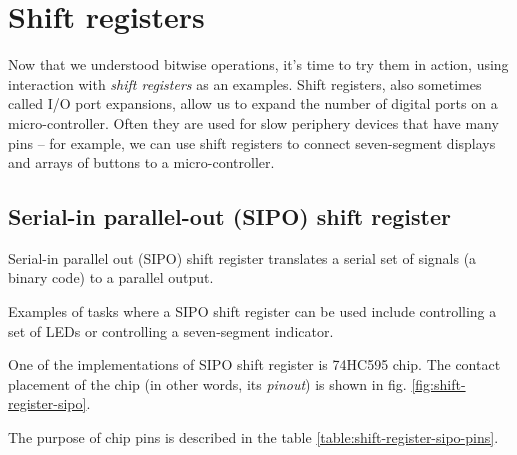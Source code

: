\documentclass[../sparc.tex]{subfiles}
\begin{document}
\newpage

\section{Shift registers}
\label{section:shift-registers}


Now that we understood bitwise operations, it's time to try them in action,
using interaction with \emph{shift registers} as an examples.  Shift registers,
also sometimes called I/O port expansions, allow us to expand the number of
digital ports on a micro-controller.  Often they are used for slow periphery
devices that have many pins -- for example, we can use shift registers to connect
seven-segment displays and arrays of buttons to a micro-controller.

\subsection{Serial-in parallel-out (SIPO) shift register}

Serial-in parallel out (\gls{SIPO}) shift register translates a serial set of
signals (a binary code) to a parallel output.

Examples of tasks where a SIPO shift register can be used include controlling a
set of LEDs or controlling a seven-segment indicator.

One of the implementations of SIPO shift register is 74HC595 chip.  The contact
placement of the chip (in other words, its \emph{pinout}) is shown in
fig. \ref{fig:shift-register-sipo}.


The purpose of chip pins is described in the table
\ref{table:shift-register-sipo-pins}.
\end{document}
